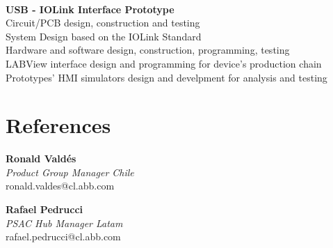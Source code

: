\documentclass[10pt,letterpaper]{article}
\begin{document}
\begin{minipage}{0.67\textwidth}
\begin{flushright}
\\[1em]\textbf{USB - IOLink Interface Prototype}
\\Circuit/PCB design, construction and testing
\\System Design based on the IOLink Standard
\\Hardware and software design, construction, programming, testing
\\LABView interface design and programming for device's production chain
\\Prototypes’ HMI simulators design and develpment for analysis and testing
\section*{\color{MidnightBlue} References}	

\begin{minipage}{2.3in}
\begin{flushright}
\textbf{Ronald Vald\'{e}s}
\\\textit{Product Group Manager Chile}
\\ronald.valdes@cl.abb.com
\end{flushright}
\end{minipage}
\begin{minipage}{2.3in}
\begin{flushright}
\textbf{Rafael Pedrucci}
\\\textit{PSAC Hub Manager Latam}
\\rafael.pedrucci@cl.abb.com
\end{flushright}
\end{minipage}
\end{flushright}

\end{minipage}	

	
\end{document}
